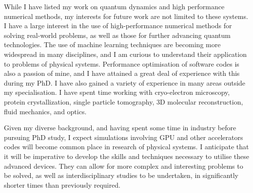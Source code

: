 \documentclass[12pt,a4paper,unicode]{moderncv}
\begin{document}
{    While I have listed my work on quantum dynamics and high performance numerical methods, my interests for future work are not limited to these systems. I have a large interest in the use of high-performance numerical methods for solving real-world problems, as well as those for further advancing quantum technologies. The use of machine learning techniques are becoming more widespread in many disciplines, and I am curious to understand their application to problems of physical systems. Performance optimisation of software codes is also a passion of mine, and I have attained a great deal of experience with this during my PhD. I have also gained a variety of experience in many areas outside my specialisation. I have spent time working with cryo-electron microscopy, protein crystallization, single particle tomography, 3D molecular reconstruction, fluid mechanics, and optics.

    Given my diverse background, and having spent some time in industry before pursuing PhD study, I expect simulations involving GPU and other accelerators codes will become common place in research of physical systems. I anticipate that it will be imperative to develop the skills and techniques necessary to utilise these advanced devices. They can allow for more complex and interesting problems to be solved, as well as interdisciplinary studies to be undertaken, in significantly shorter times than previously required.



}
\end{document}

